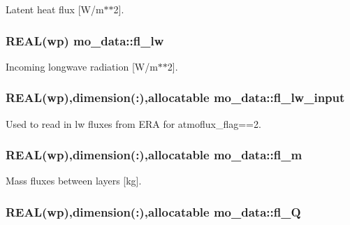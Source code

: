 Latent heat flux \mbox{[}W/m$\ast$$\ast$2\mbox{]}. 

\hypertarget{namespacemo__data_a0224a603e8070ac503b13ae82c8e6b99}{
\subsubsection[{fl\_\-lw}]{\setlength{\rightskip}{0pt plus 5cm}REAL(wp) {\bf mo\_\-data::fl\_\-lw}}}
\label{namespacemo__data_a0224a603e8070ac503b13ae82c8e6b99}


Incoming longwave radiation \mbox{[}W/m$\ast$$\ast$2\mbox{]}. 

\hypertarget{namespacemo__data_a2d2ccb1188895b74eb3e2742c6a82b4c}{
\subsubsection[{fl\_\-lw\_\-input}]{\setlength{\rightskip}{0pt plus 5cm}REAL(wp),dimension(:),allocatable {\bf mo\_\-data::fl\_\-lw\_\-input}}}
\label{namespacemo__data_a2d2ccb1188895b74eb3e2742c6a82b4c}


Used to read in lw fluxes from ERA for atmoflux\_\-flag==2. 

\hypertarget{namespacemo__data_ac4fb31397da08679eac0e3089b60447a}{
\subsubsection[{fl\_\-m}]{\setlength{\rightskip}{0pt plus 5cm}REAL(wp),dimension(:),allocatable {\bf mo\_\-data::fl\_\-m}}}
\label{namespacemo__data_ac4fb31397da08679eac0e3089b60447a}


Mass fluxes between layers \mbox{[}kg\mbox{]}. 

\hypertarget{namespacemo__data_a594603db2866303fb0074ab34692fa4a}{
\subsubsection[{fl\_\-Q}]{\setlength{\rightskip}{0pt plus 5cm}REAL(wp),dimension(:),allocatable {\bf mo\_\-data::fl\_\-Q}}}
\label{namespacemo__data_a594603db2866303fb0074ab34692fa4a}


